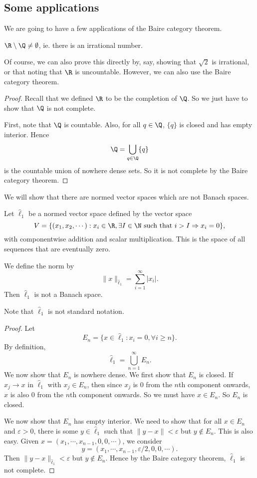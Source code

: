 \documentclass[a4paper]{article}
\begin{document}
\subsection{Some applications}
We are going to have a few applications of the Baire category theorem.

\begin{prop}
  $\R \setminus \Q \not= \emptyset$, ie. there is an irrational number.
\end{prop}
Of course, we can also prove this directly by, say, showing that $\sqrt{2}$ is irrational, or that noting that $\R$ is uncountable. However, we can also use the Baire category theorem.

\begin{proof}
  Recall that we defined $\R$ to be the completion of $\Q$. So we just have to show that $\Q$ is not complete.

  First, note that $\Q$ is countable. Also, for all $q \in \Q$, $\{q\}$ is closed and has empty interior. Hence
  \[
    \Q = \bigcup_{q \in \Q}\{q\}
  \]
  is the countable union of nowhere dense sets. So it is not complete by the Baire category theorem.
\end{proof}

We will show that there are normed vector spaces which are not Banach spaces.
\begin{prop}
  Let $\hat{\ell}_1$ be a normed vector space defined by the vector space
  \[
    V = \{(x_1, x_2, \cdots): x_i \in \R, \exists I \in \N \text{ such that } i > I \Rightarrow x_i = 0\},
  \]
  with componentwise addition and scalar multiplication. This is the space of all sequences that are eventually zero.

  We define the norm by
  \[
    \|x\|_{\hat{\ell}_1} = \sum_{i = 1}^\infty |x_i|.
  \]
  Then $\hat{\ell}_1$ is not a Banach space.
\end{prop}
Note that $\hat{\ell}_1$ is not standard notation.

\begin{proof}
  Let
  \[
    E_n = \{x\in \hat{\ell}_1: x_i = 0, \forall i \geq n\}.
  \]
  By definition,
  \[
    \hat{\ell}_1 = \bigcup_{n = 1}^\infty E_n.
  \]
  We now show that $E_n$ is nowhere dense. We first show that $E_n$ is closed. If $x_j \to x$ in $\hat{\ell}_1$ with $x_j \in E_n$, then since $x_j$ is $0$ from the $n$th component onwards, $x$ is also $0$ from the $n$th component onwards. So we must have $x \in E_n$. So $E_n$ is closed.

  We now show that $E_n$ has empty interior. We need to show that for all $x\in E_n$ and $\varepsilon >  0$, there is some $y \in \hat{\ell}_1$ such that $\|y - x\| < \varepsilon$ but $y\not\in E_n$. This is also easy. Given $x = (x_1, \cdots, x_{n - 1}, 0, 0, \cdots)$, we consider
  \[
    y = (x_1, \cdots, x_{n - 1}, \varepsilon/2, 0, 0,\cdots).
  \]
  Then $\|y - x\|_{\hat{\ell}_1} < \varepsilon$ but $y \not\in E_n$. Hence by the Baire category theorem, $\hat{\ell}_1$ is not complete.
\end{proof}
\end{document}
